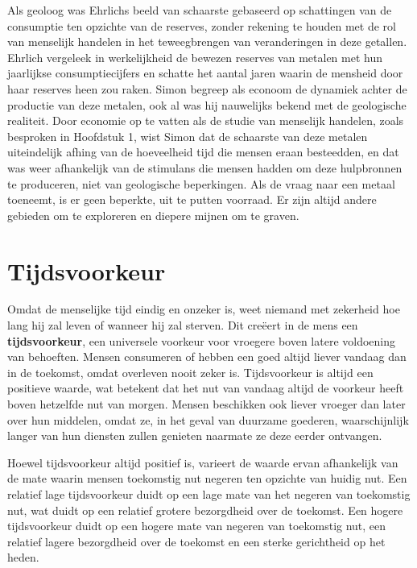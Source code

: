 Als geoloog was Ehrlichs beeld van schaarste gebaseerd op schattingen
van de consumptie ten opzichte van de reserves, zonder rekening te
houden met de rol van menselijk handelen in het teweegbrengen van
veranderingen in deze getallen. Ehrlich vergeleek in werkelijkheid de
bewezen reserves van metalen met hun jaarlijkse consumptiecijfers en
schatte het aantal jaren waarin de mensheid door haar reserves heen zou
raken. Simon begreep als econoom de dynamiek achter de productie van
deze metalen, ook al was hij nauwelijks bekend met de geologische
realiteit. Door economie op te vatten als de studie van menselijk
handelen, zoals besproken in Hoofdstuk 1, wist Simon dat de schaarste
van deze metalen uiteindelijk afhing van de hoeveelheid tijd die mensen
eraan besteedden, en dat was weer afhankelijk van de stimulans die
mensen hadden om deze hulpbronnen te produceren, niet van geologische
beperkingen. Als de vraag naar een metaal toeneemt, is er geen beperkte,
uit te putten voorraad. Er zijn altijd andere gebieden om te exploreren
en diepere mijnen om te graven.

\section{Tijdsvoorkeur}

Omdat de menselijke tijd eindig en onzeker is, weet niemand met
zekerheid hoe lang hij zal leven of wanneer hij zal sterven. Dit creëert
in de mens een \textbf{tijdsvoorkeur}, een universele voorkeur voor
vroegere boven latere voldoening van behoeften. Mensen consumeren of
hebben een goed altijd liever vandaag dan in de toekomst, omdat
overleven nooit zeker is. Tijdsvoorkeur is altijd een positieve waarde,
wat betekent dat het nut van vandaag altijd de voorkeur heeft boven
hetzelfde nut van morgen. Mensen beschikken ook liever vroeger dan later
over hun middelen, omdat ze, in het geval van duurzame goederen,
waarschijnlijk langer van hun diensten zullen genieten naarmate ze deze
eerder ontvangen.

Hoewel tijdsvoorkeur altijd positief is, varieert de waarde ervan
afhankelijk van de mate waarin mensen toekomstig nut negeren ten
opzichte van huidig nut. Een relatief lage tijdsvoorkeur duidt op een
lage mate van het negeren van toekomstig nut, wat duidt op een relatief
grotere bezorgdheid over de toekomst. Een hogere tijdsvoorkeur duidt op
een hogere mate van negeren van toekomstig nut, een relatief lagere
bezorgdheid over de toekomst en een sterke gerichtheid op het heden.

